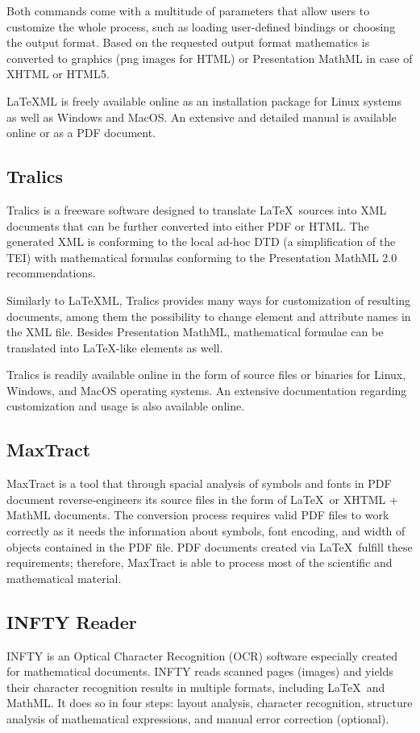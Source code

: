\documentclass[11pt,oneside,final]{fithesis2}
\begin{document}
Both commands come with a multitude of parameters that allow users to customize the whole process, such as loading user-defined bindings or choosing the output format. Based on the requested output format mathematics is converted to graphics (png images for HTML) or Presentation MathML in case of XHTML or HTML5. 

\LaTeX ML is freely available online as an installation package for Linux systems as well as Windows and MacOS. An extensive and detailed manual is available online or as a PDF document.

\subsection{Tralics}
Tralics \cite{tralics:grimm2003}\cite{dml:Grimm2010} is a freeware software designed to translate \LaTeX\ sources into XML documents that can be further converted into either PDF or HTML. The generated XML is conforming to the local ad-hoc DTD (a simplification of the TEI) with mathematical formulas conforming to the Presentation MathML 2.0 recommendations.

Similarly to \LaTeX ML, Tralics provides many ways for customization of resulting documents, among them the possibility to change element and attribute names in the XML file. Besides Presentation MathML, mathematical formulae can be translated into \LaTeX -like   elements as well.

Tralics is readily available online in the form of source files or binaries for Linux, Windows, and MacOS operating systems. An extensive documentation regarding customization and usage is also available online. 

\subsection{MaxTract}
MaxTract \cite{baker2012maxtract} is a tool that through spacial analysis of symbols and fonts in PDF document reverse-engineers its source files in the form of \LaTeX\ or XHTML + MathML documents. The conversion process requires valid PDF files to work correctly as it needs the information about symbols, font encoding, and width of objects contained in the PDF file. PDF documents created via \LaTeX\ fulfill these requirements; therefore, MaxTract is able to process most of the scientific and mathematical material.


\subsection{INFTY Reader}
INFTY \cite{suzuki2003infty} is an Optical Character Recognition (OCR) software especially created for mathematical documents. INFTY reads scanned pages (images) and yields their character recognition results in multiple formats, including \LaTeX\ and MathML. It does so in four steps: layout analysis, character recognition, structure analysis of mathematical expressions, and manual error correction (optional). 
\end{document}
